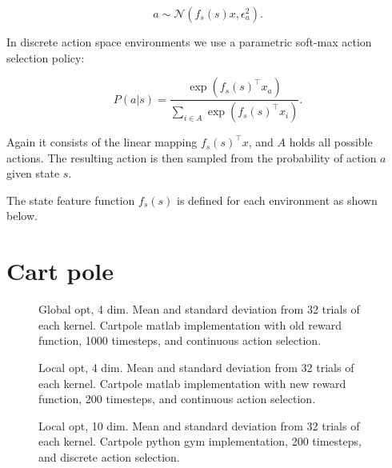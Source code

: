 $$a \sim \mathcal{N}(f_s(s) x,\epsilon_a^2).$$

In discrete action space environments we use a parametric soft-max action selection policy:

$$P(a|s)= \frac{\exp(f_s(s)^\top x_a)}{\sum_{i\in A} \exp(f_s(s)^\top x_i)}.$$

Again it consists of the linear mapping $f_s(s)^\top x$, and $A$ holds all possible actions. The resulting action is then sampled from the probability of action $a$ given state $s$.

The state feature function $f_s(s)$ is defined for each environment as shown below.

\section{Cart pole}


\begin{figure}
    \begin{center}
        \caption{Global opt, 4 dim. Mean and standard deviation from 32 trials of each kernel. Cartpole matlab implementation with old reward function, 1000 timesteps, and continuous action selection.}
    \end{center}
\end{figure}

\begin{figure}
    \begin{center}
        \caption{Local opt, 4 dim. Mean and standard deviation from 32 trials of each kernel. Cartpole matlab implementation with new reward function, 200 timesteps, and continuous action selection.}
    \end{center}
\end{figure}

\begin{figure}
    \begin{center}
        \caption{Local opt, 10 dim. Mean and standard deviation from 32 trials of each kernel. Cartpole python gym implementation, 200 timesteps, and discrete action selection.}
    \end{center}
\end{figure}
